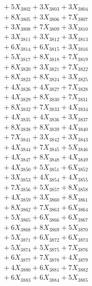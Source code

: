 \documentclass[a4paper,10pt]{article}
\begin{document}
{\begin{align}
&\;  + 5 X_{3802} + 3 X_{3803} + 3 X_{3804} \\[0.3ex]
&\;  + 8 X_{3805} + 3 X_{3806} + 7 X_{3807} \\[0.3ex]
&\;  + 3 X_{3808} + 7 X_{3809} + 3 X_{3810} \\[0.3ex]
&\;  + 3 X_{3811} + 3 X_{3812} + 3 X_{3813} \\[0.3ex]
&\;  + 6 X_{3814} + 6 X_{3815} + 3 X_{3816} \\[0.3ex]
&\;  + 5 X_{3817} + 8 X_{3818} + 7 X_{3819} \\[0.5ex]\allowbreak
&\;  + 8 X_{3820} + 3 X_{3821} + 7 X_{3822} \\[0.3ex]
&\;  + 8 X_{3823} + 8 X_{3824} + 3 X_{3825} \\[0.3ex]
&\;  + 4 X_{3826} + 4 X_{3827} + 7 X_{3828} \\[0.3ex]
&\;  + 4 X_{3829} + 8 X_{3830} + 7 X_{3831} \\[0.3ex]
&\;  + 8 X_{3832} + 7 X_{3833} + 4 X_{3834} \\[0.3ex]
&\;  + 4 X_{3835} + 4 X_{3836} + 3 X_{3837} \\[0.3ex]
&\;  + 8 X_{3838} + 8 X_{3839} + 4 X_{3840} \\[0.3ex]
&\;  + 7 X_{3841} + 3 X_{3842} + 3 X_{3843} \\[0.3ex]
&\;  + 4 X_{3844} + 7 X_{3845} + 5 X_{3846} \\[0.3ex]
&\;  + 4 X_{3847} + 8 X_{3848} + 4 X_{3849} \\[0.5ex]\allowbreak
&\;  + 4 X_{3850} + 5 X_{3851} + 6 X_{3852} \\[0.3ex]
&\;  + 3 X_{3853} + 4 X_{3854} + 4 X_{3855} \\[0.3ex]
&\;  + 7 X_{3856} + 5 X_{3857} + 8 X_{3858} \\[0.3ex]
&\;  + 4 X_{3859} + 3 X_{3860} + 8 X_{3861} \\[0.3ex]
&\;  + 8 X_{3862} + 7 X_{3863} + 6 X_{3864} \\[0.3ex]
&\;  + 5 X_{3865} + 6 X_{3866} + 6 X_{3867} \\[0.3ex]
&\;  + 6 X_{3868} + 8 X_{3869} + 5 X_{3870} \\[0.3ex]
&\;  + 5 X_{3871} + 6 X_{3872} + 6 X_{3873} \\[0.3ex]
&\;  + 5 X_{3874} + 5 X_{3875} + 7 X_{3876} \\[0.3ex]
&\;  + 6 X_{3877} + 7 X_{3878} + 4 X_{3879} \\[0.5ex]\allowbreak
&\;  + 4 X_{3880} + 6 X_{3881} + 7 X_{3882} \\[0.3ex]
&\;  + 6 X_{3883} + 6 X_{3884} + 5 X_{3885} \\[0.3ex]

\end{align}}
\end{document}
